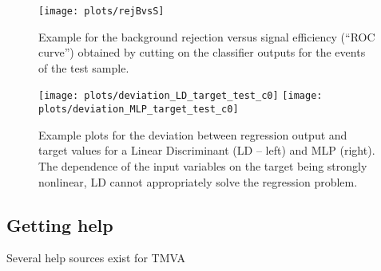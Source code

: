 \begin{figure}[t]
\begin{center}
  \texttt{[image: plots/rejBvsS]}
\end{center}
\vspace{-0.5cm}
\caption[.]{Example for the background rejection versus signal efficiency (``ROC curve'') obtained
            by cutting on the classifier outputs for the events of the test sample.
             }
\label{fig:usingtmva:rejBvsS}
\end{figure}
\begin{figure}[t]
\begin{center}
  \texttt{[image: plots/deviation\_LD\_target\_test\_c0]}
  \hspace{-0.3cm}
  \texttt{[image: plots/deviation\_MLP\_target\_test\_c0]}
  \vspace{0.2cm}
\end{center}
\vspace{-1.2cm}
\caption[.]{Example plots for the deviation between regression output and target values
            for a Linear Discriminant (LD -- left) and MLP (right). The dependence of the
            input variables on the target being strongly nonlinear, LD cannot appropriately
            solve the regression problem. }
\label{fig:usingtmva:deviation}
\end{figure}



\subsection{Getting help}

Several help sources exist for TMVA

